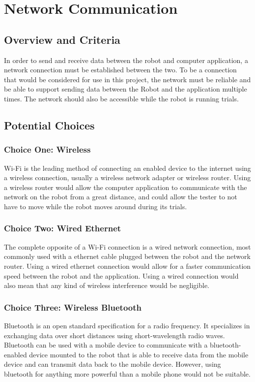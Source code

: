\documentclass[onecolumn, draftclsnofoot,10pt, compsoc]{IEEEtran}
\begin{document}
\section{Network Communication}
\subsection{Overview and Criteria}
In order to send and receive data between the robot and computer application, a network connection must be established between the two. To be a connection that would be considered for use in this project, the network must be reliable and be able to support sending data between the Robot and the application multiple times. The network should also be accessible while the robot is running trials.

\subsection{Potential Choices}
\subsubsection{Choice One: Wireless}
Wi-Fi is the leading method of connecting an enabled device to the internet using a wireless connection, usually a wireless network adapter or wireless router. Using a wireless router would allow the computer application to communicate with the network on the robot from a great distance, and could allow the tester to not have to move while the robot moves around during its trials.

\subsubsection{Choice Two: Wired Ethernet}
The complete opposite of a Wi-Fi connection is a wired network connection, most commonly used with a ethernet cable plugged between the robot and the network router. Using a wired ethernet connection would allow for a faster communication speed between the robot and the application. Using a wired connection would also mean that any kind of wireless interference would be negligible.

\subsubsection{Choice Three: Wireless Bluetooth}
Bluetooth is an open standard specification for a radio frequency. It specializes in exchanging data over short distances using short-wavelength radio waves. Bluetooth can be used with a mobile device to communicate with a bluetooth-enabled device mounted to the robot that is able to receive data from the mobile device and can transmit data back to the mobile device. However, using bluetooth for anything more powerful than a mobile phone would not be suitable.\cite{Bluetooth_Robot}
\end{document}
